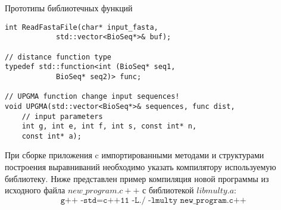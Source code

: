 \begin{algorithm}
	\caption{Прототипы библиотечных функций} \label{lst:LibHeader}
	\begin{lstlisting}
int ReadFastaFile(char* input_fasta, 
			std::vector<BioSeq*>& buf);
			
// distance function type
typedef std::function<int (BioSeq* seq1, 
			BioSeq* seq2)> func;
			
// UPGMA function change input sequences!
void UPGMA(std::vector<BioSeq*>& sequences, func dist, 
	// input parameters
	int g, int e, int f, int s, const int* n, 
	const int* a);
	\end{lstlisting}
\end{algorithm}

При сборке приложения c импортированными методами и структурами построения выравниваний необходимо указать компилятору используемую библиотеку. Ниже представлен пример компиляция новой программы из исходного файла $new\_program.c++$ с библиотекой $libmulty.a$: 
\begin{equation*}
\texttt{g++ -std=c++11 -L./ -lmulty new\_program.c++ }
\end{equation*}
